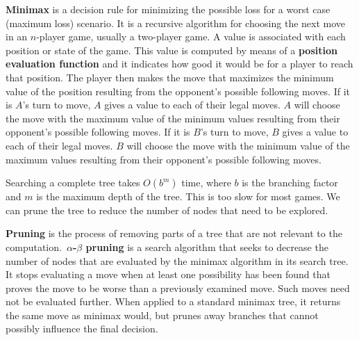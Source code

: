\begin{definition}
    \textbf{Minimax} is a decision rule for minimizing the possible loss for a worst case (maximum loss) scenario. It is a recursive algorithm for choosing the next move in an $n$-player game, usually a two-player game. A value is associated with each position or state of the game. This value is computed by means of a \textbf{position evaluation function} and it indicates how good it would be for a player to reach that position. The player then makes the move that maximizes the minimum value of the position resulting from the opponent's possible following moves. If it is $A$'s turn to move, $A$ gives a value to each of their legal moves. $A$ will choose the move with the maximum value of the minimum values resulting from their opponent's possible following moves. If it is $B$'s turn to move, $B$ gives a value to each of their legal moves. $B$ will choose the move with the minimum value of the maximum values resulting from their opponent's possible following moves.
\end{definition}

Searching a complete tree takes $O(b^{m})$ time, where $b$ is the branching factor and $m$ is the maximum depth of the tree. This is too slow for most games. We can prune the tree to reduce the number of nodes that need to be explored.

\begin{definition}
    \textbf{Pruning} is the process of removing parts of a tree that are not relevant to the computation.\ \textbf{$\alpha$-$\beta$ pruning} is a search algorithm that seeks to decrease the number of nodes that are evaluated by the minimax algorithm in its search tree. It stops evaluating a move when at least one possibility has been found that proves the move to be worse than a previously examined move. Such moves need not be evaluated further. When applied to a standard minimax tree, it returns the same move as minimax would, but prunes away branches that cannot possibly influence the final decision.
\end{definition}


